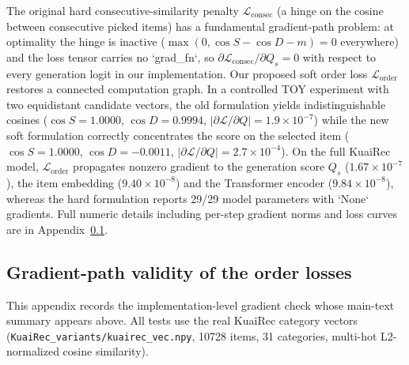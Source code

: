 The original hard consecutive-similarity penalty $\mathcal{L}_{\text{consec}}$
(a hinge on the cosine between consecutive picked items) has a fundamental
gradient-path problem: at optimality the hinge is inactive
($\max(0,\cos S - \cos D - m) = 0$ everywhere) and the loss tensor carries
no `grad_fn`, so $\partial \mathcal{L}_{\text{consec}} / \partial Q_s = 0$
with respect to every generation logit in our implementation. Our proposed
soft order loss $\mathcal{L}_{\text{order}}$ restores a connected computation
graph. In a controlled TOY experiment with two equidistant candidate vectors,
the old formulation yields indistinguishable cosines
($\cos S = 1.0000$, $\cos D = 0.9994$, $|\partial \mathcal{L}/\partial Q| =
1.9\times10^{-7}$) while the new soft formulation correctly concentrates the
score on the selected item ($\cos S = 1.0000$, $\cos D = -0.0011$,
$|\partial \mathcal{L}/\partial Q| = 2.7\times10^{-4}$). On the full KuaiRec
model, $\mathcal{L}_{\text{order}}$ propagates nonzero gradient to the
generation score $Q_s$ ($1.67\times10^{-7}$), the item embedding
($9.40\times10^{-8}$) and the Transformer encoder ($9.84\times10^{-8}$),
whereas the hard formulation reports 29/29 model parameters with `None`
gradients. Full numeric details including per-step gradient norms and loss
curves are in Appendix~\ref{app:gradient_check}.


\subsection{Gradient-path validity of the order losses}
\label{app:gradient_check}
This appendix records the implementation-level gradient check whose
main-text summary appears above. All tests use the real KuaiRec category
vectors (\texttt{KuaiRec\_variants/kuairec\_vec.npy}, 10728 items,
31 categories, multi-hot L2-normalized cosine similarity).

